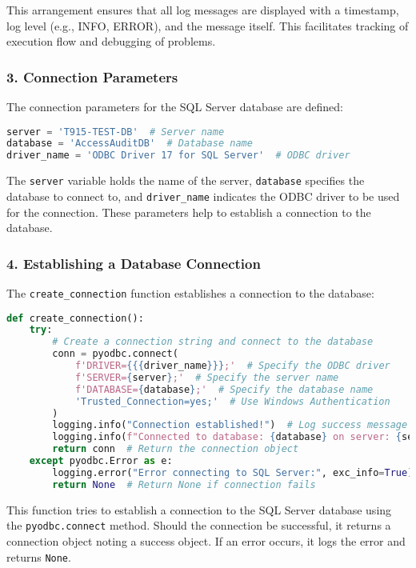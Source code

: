 This arrangement ensures that all log messages are displayed with a timestamp, log level (e.g., INFO, ERROR), and the message itself. This facilitates tracking of execution flow and debugging of problems.

\subsubsection*{3. Connection Parameters}
The connection parameters for the SQL Server database are defined:
\begin{lstlisting}[language=Python]
server = 'T915-TEST-DB'  # Server name
database = 'AccessAuditDB'  # Database name
driver_name = 'ODBC Driver 17 for SQL Server'  # ODBC driver
\end{lstlisting}\vspace{.4cm}

The \texttt{server} variable holds the name of the server, \texttt{database} specifies the database to connect to, and \texttt{driver\_name} indicates the ODBC driver to be used for the connection. These parameters help to establish a connection to the database.

\subsubsection*{4. Establishing a Database Connection}
The \texttt{create\_connection} function establishes a connection to the database:
\begin{lstlisting}[language=Python]
def create_connection():
    try:
        # Create a connection string and connect to the database
        conn = pyodbc.connect(
            f'DRIVER={{{driver_name}}};'  # Specify the ODBC driver
            f'SERVER={server};'  # Specify the server name
            f'DATABASE={database};'  # Specify the database name
            'Trusted_Connection=yes;'  # Use Windows Authentication
        )
        logging.info("Connection established!")  # Log success message
        logging.info(f"Connected to database: {database} on server: {server}")  # Log connection details
        return conn  # Return the connection object
    except pyodbc.Error as e:
        logging.error("Error connecting to SQL Server:", exc_info=True)  # Log error message
        return None  # Return None if connection fails
\end{lstlisting}\vspace{.4cm}

This function tries to establish a connection to the SQL Server database using the \texttt{pyodbc.connect} method. Should the connection be successful, it returns a connection object noting a success object. If an error occurs, it logs the error and returns \texttt{None}.

